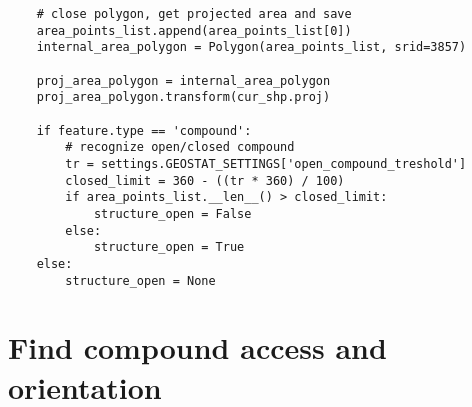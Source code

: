 \begin{lstlisting}
    # close polygon, get projected area and save
    area_points_list.append(area_points_list[0])
    internal_area_polygon = Polygon(area_points_list, srid=3857)

    proj_area_polygon = internal_area_polygon
    proj_area_polygon.transform(cur_shp.proj)

    if feature.type == 'compound':
        # recognize open/closed compound
        tr = settings.GEOSTAT_SETTINGS['open_compound_treshold']
        closed_limit = 360 - ((tr * 360) / 100)
        if area_points_list.__len__() > closed_limit:
            structure_open = False
        else:
            structure_open = True
    else:
        structure_open = None
    \end{lstlisting}

\section{Find compound access and orientation}
\label{sec:code-access}

